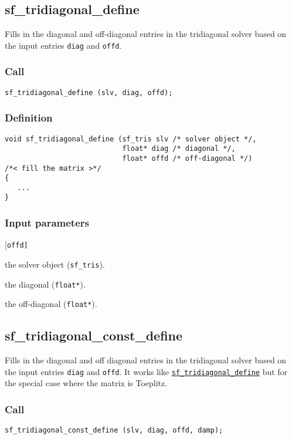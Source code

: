 \subsection{{sf\_tridiagonal\_define}}\label{sec:sf_tridiagonal_define}
Fills in the diagonal and off-diagonal entries in the tridiagonal solver based on the input entries \texttt{diag} and \texttt{offd}.

\subsubsection*{Call}
\begin{verbatim}sf_tridiagonal_define (slv, diag, offd);\end{verbatim}

\subsubsection*{Definition}
\begin{verbatim}
void sf_tridiagonal_define (sf_tris slv /* solver object */, 
                            float* diag /* diagonal */, 
                            float* offd /* off-diagonal */)
/*< fill the matrix >*/
{
   ...
}
\end{verbatim}

\subsubsection*{Input parameters}
\begin{desclist}{\tt }{\quad}[\tt offd]
   \setlength\itemsep{0pt}
   \item[slv]  the solver object (\texttt{sf\_tris}). 
   \item[diag] the diagonal (\texttt{float*}).
   \item[offd] the off-diagonal (\texttt{float*}).
\end{desclist}




\subsection{{sf\_tridiagonal\_const\_define}}
Fills in the diagonal and off diagonal entries in the tridiagonal solver based on the input entries \texttt{diag} and \texttt{offd}. It works like \hyperref[sec:sf_tridiagonal_define]{\texttt{sf\_tridiagonal\_define}} but for the special case where the matrix is Toeplitz.

\subsubsection*{Call}
\begin{verbatim}sf_tridiagonal_const_define (slv, diag, offd, damp);\end{verbatim}

